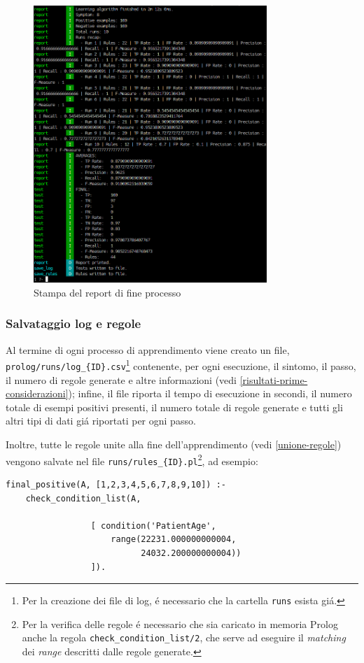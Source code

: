 \documentclass[preprint]{acm_proc_article-sp}
\begin{document}
\begin{figure}[!h]
\centering
\includegraphics[width=250pt]{figures/prolog-report.png}
\caption{Stampa del report di fine processo}
\label{fig:prolog-report}
\end{figure}

\subsubsection{Salvataggio log e regole}
Al termine di ogni processo di apprendimento viene creato un file, \verb|prolog/runs/log_{ID}.csv|\footnote{Per la creazione dei file di log, \'e necessario che la cartella \verb|runs| esista gi\'a.} contenente, per ogni esecuzione, il sintomo, il passo, il numero di regole generate e altre informazioni (vedi \ref{risultati-prime-considerazioni}); infine, il file riporta il tempo di esecuzione in secondi, il numero totale di esempi positivi presenti, il numero totale di regole generate e tutti gli altri tipi di dati gi\'a riportati per ogni passo.

Inoltre, tutte le regole unite alla fine dell'apprendimento (vedi \ref{unione-regole}) vengono salvate nel file \verb|runs/rules_{ID}.pl|\footnote{Per la verifica delle regole \'e necessario che sia caricato in memoria Prolog anche la regola \verb|check_condition_list/2|, che serve ad eseguire il \textit{matching} dei \textit{range} descritti dalle regole generate.}, ad esempio:
\begin{verbatim}
final_positive(A, [1,2,3,4,5,6,7,8,9,10]) :-
	check_condition_list(A,
			     
			     [ condition('PatientAge',
					 range(22231.000000000004,
					       24032.200000000004))
			     ]).
\end{verbatim}
\end{document}
